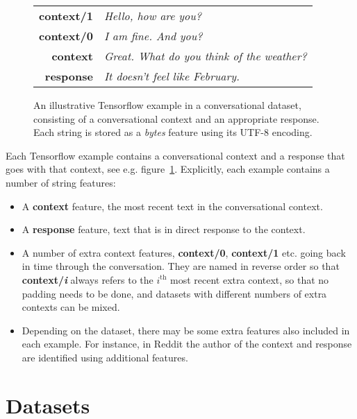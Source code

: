 \documentclass[11pt,a4paper,table]{article}
\begin{document}
\begin{figure}[htb]
    \centering
    {\small
        \begin{tabular}{>{\bfseries}r >{\itshape}l}
          context/1 & Hello, how are you? \\
          context/0& I am fine. And you? \\
          context & Great. What do you think of the weather? \\
          response & It doesn't feel like February. \\
        \end{tabular}
    }
    
    \caption{
        \label{fig:example}
        An illustrative Tensorflow example in a conversational dataset, consisting of a conversational context and an appropriate response. Each string is stored as a \emph{bytes} feature using its UTF-8 encoding.
    }

\end{figure}

Each Tensorflow example contains a conversational context and a response that goes with that context, see e.g. figure~\ref{fig:example}. Explicitly, each example contains a number of string features:

\begin{itemize}
  \setlength\itemsep{0.1em}
\item A \textbf{context} feature, the most recent text in the conversational context.
\item A \textbf{response} feature, text that is in direct response to the context.
\item A number of extra context features, \textbf{context/0}, \textbf{context/1} etc. going back in time through the conversation. They are named in reverse order so that \textbf{context/\emph{i}} always refers to the $i^\text{th}$ most recent extra context, so that no padding needs to be done, and datasets with different numbers of extra contexts can be mixed.
\item Depending on the dataset, there may be some extra features also included in each example. For instance, in Reddit the author of the context and response are identified using additional features.
\end{itemize}

\section{Datasets}
\label{sec:datasets}
\end{document}
